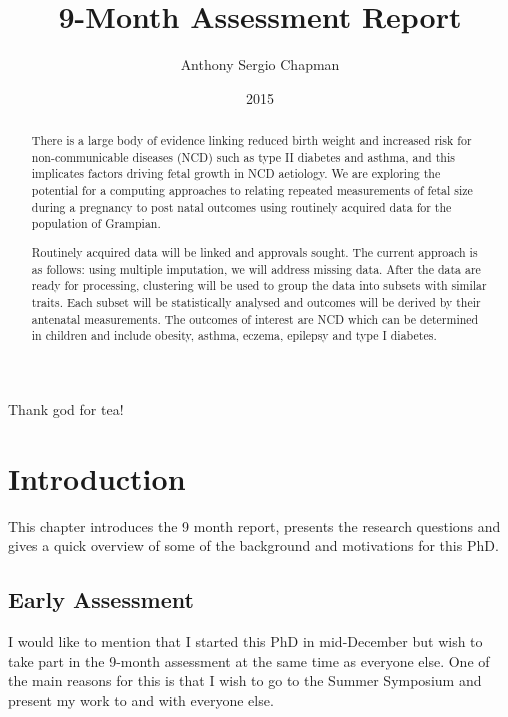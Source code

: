 \documentclass[bsc]{abdnthesis}
\author{Anthony Sergio Chapman}
\title{9-Month Assessment Report}
\date{2015}
\begin{document}
\maketitle
\makedeclaration


\begin{abstract}
There is a large body of evidence linking reduced birth weight and increased risk for non-communicable diseases (NCD) such as type II diabetes and asthma, and this implicates factors driving fetal growth in NCD aetiology. We are exploring the potential for a computing approaches to relating repeated measurements of fetal size during a pregnancy to post natal outcomes using routinely acquired data for the population of Grampian.

Routinely acquired data will be linked and approvals sought.  The current approach is as follows: using multiple imputation, we will address missing data. After the data are ready for processing, clustering will be used to group the data into subsets with similar traits. Each subset will be statistically analysed and outcomes will be derived by their antenatal measurements. The outcomes of interest are NCD which can be determined in children and include obesity, asthma, eczema, epilepsy and type I diabetes.
\end{abstract}

\begin{acknowledgements}
  Thank god for tea!
\end{acknowledgements}

\tableofcontents

\clearpage
\setcounter{page}{1}

\chapter{Introduction}
This chapter introduces the 9 month report, presents the research questions and gives a quick overview of some of the background and motivations for this PhD. 

\section{Early Assessment} %
\label{sec:early_assessment}
I would like to mention that I started this PhD in mid-December but wish to take part in the 9-month assessment at the same time as everyone else. One of the main reasons for this is that I wish to go to the Summer Symposium and present my work to and with everyone else. 
\end{document}
